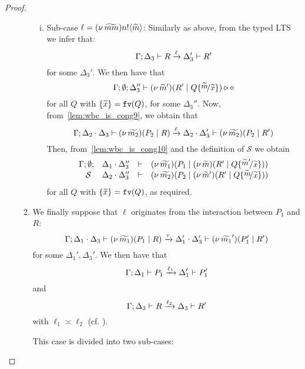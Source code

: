 \begin{proof}
\begin{enumerate}[I.]
\begin{enumerate}[1.]
\begin{enumerate}[i.]
				\item	Sub-case $\ell = (\nu\, \widetilde{mm}) n ! \langle \widetilde{m} \rangle$: Similarly as above, 
						from the typed LTS we infer that:
					\begin{equation}
					\Gamma; \Delta_3 \vdash R \xrightarrow{\ell} \Delta_3' \vdash R'
							\label{lem:wbc_is_cong9}
							\end{equation}
							for some $\Delta_3'$. We then have that 
				\begin{equation}
				\Gamma; \emptyset; \Delta_3'' \proves \newsp{\widetilde{m}'}{R' \Par Q \subst{\widetilde{m}}{\widetilde{x}}} \hastype \Proc
							\label{lem:wbc_is_cong10}
					\end{equation}
					 for all $Q$ with $\{\widetilde{x}\} = \mathtt{fv}(Q)$, for some $\Delta_3''$.
				Now, from~\eqref{lem:wbc_is_cong9}, we obtain that
					\[
						\Gamma; \Delta_2 \cdot \Delta_3 \vdash (\nu\, \widetilde{m_2})(P_2 \;|\; R) \xrightarrow{\ell} \Delta_2 \cdot \Delta_3' \vdash (\nu\, \widetilde{m_2})(P_2 \;|\; R')
					\]
					Then, from~\eqref{lem:wbc_is_cong10} and the definition of $\mathcal{S}$ we obtain
					\[
						\mhorel{\Gamma}{\Delta_1 \cat \Delta_3''}{\newsp{\widetilde{m_1}}{P_1 \Par \newsp{\widetilde{m}}{R' \Par Q \subst{\widetilde{m}'}{\widetilde{x}}}}}
						{\ \mathcal{S}\ }
						{\Delta_2 \cat \Delta_3''}{}{\newsp{\widetilde{m_2}}{P_2 \Par \newsp{\widetilde{m}'}{R' \Par Q \subst{\widetilde{m}}{\widetilde{x}}}}}
					\]
					 for all $Q$ with $\{\widetilde{x}\} = \mathtt{fv}(Q)$, as required.
			\end{enumerate}


	\item We finally suppose that $\ell$ originates from the interaction between $P_1$ and $R$:
			\[
				\Gamma; \Delta_1 \cdot \Delta_3 \vdash (\nu\, \widetilde{m_1})(P_1 \;|\; R) \xrightarrow{\tau} \Delta_1' \cdot \Delta_3' \vdash (\nu\, \widetilde{m_1}')(P_1' \;|\; R')
			\]
			for some $\Delta_1', \Delta_3'$. We then have that 
			$$\Gamma; \Delta_1 \vdash P_1 \xrightarrow{\ell_1} \Delta_1' \vdash P_1'$$
			and 
			\begin{equation}
			\Gamma; \Delta_3 \vdash R \xrightarrow{\ell_2} \Delta_3 \vdash R'
			\label{lem:wbc_is_cong11}
			\end{equation}
			with $\ell_1 \asymp \ell_2$ (cf. ). 
			
			This case is divided into two sub-cases:

			\begin{enumerate}[i.]


\end{enumerate}
\end{enumerate}
\end{enumerate}
\end{proof}
